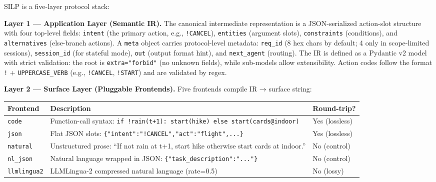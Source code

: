SILP is a five-layer protocol stack:



\textbf{Layer 1 --- Application Layer (Semantic IR).} The canonical intermediate representation is a JSON-serialized action-slot structure with four top-level fields: \texttt{intent} (the primary action, e.g., \texttt{!CANCEL}), \texttt{entities} (argument slots), \texttt{constraints} (conditions), and \texttt{alternatives} (else-branch actions). A \texttt{meta} object carries protocol-level metadata: \texttt{req\_id} (8 hex chars by default; 4 only in scope-limited sessions), \texttt{session\_id} (for stateful mode), \texttt{out} (output format hint), and \texttt{next\_agent} (routing). The IR is defined as a Pydantic v2 model with strict validation: the root is \texttt{extra="forbid"} (no unknown fields), while sub-models allow extensibility. Action codes follow the format \texttt{!} + \texttt{UPPERCASE\_VERB} (e.g., \texttt{!CANCEL}, \texttt{!START}) and are validated by regex.



\textbf{Layer 2 --- Surface Layer (Pluggable Frontends).} Five frontends compile IR → surface string:



{\def\LTcaptype{none} %

\begin{longtable}[]{@{}lll@{}}

\toprule\noalign{}

Frontend & Description & Round-trip? \\

\midrule\noalign{}

\endhead

\bottomrule\noalign{}

\endlastfoot

\texttt{code} & Function-call syntax: \texttt{if\ !rain(t+1):\ start(hike)\ else\ start(cards@indoor)} & Yes (lossless) \\

\texttt{json} & Flat JSON slots: \texttt{\{"intent":"!CANCEL","act":"flight",...\}} & Yes (lossless) \\

\texttt{natural} & Unstructured prose: ``If not rain at t+1, start hike otherwise start cards at indoor.'' & No (control) \\

\texttt{nl\_json} & Natural language wrapped in JSON: \texttt{\{"task\_description":"..."\}} & No (control) \\

\texttt{llmlingua2} & LLMLingua-2 compressed natural language (rate=0.5) & No (lossy) \\

\end{longtable}

}



